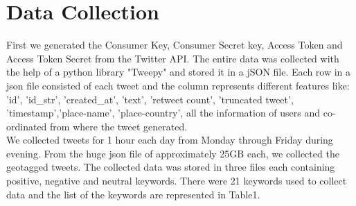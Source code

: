 \documentclass[12pt, oneside]{article}   	%
\begin{document}
\section{Data Collection}

\noindent
First we generated the Consumer Key, Consumer Secret key, Access Token and Access Token Secret from the Twitter API. The entire data was collected with the help of a python library "Tweepy" and stored it in a jSON file. Each row in a json file consisted of each tweet and the column represents different features like: 'id', 'id\_str', 'created\_at', 'text', 'retweet count', 'truncated tweet', 'timestamp','place-name', 'place-country', all the information of users and co-ordinated from where the tweet generated.\\

\noindent
We collected tweets for 1 hour each day from Monday through Friday during evening. From the huge json file of approximately 25GB each, we collected the geotagged tweets. The collected data was stored in three files each containing positive, negative and neutral keywords. There were 21 keywords used to collect data and the list of the keywords are represented in Table1.
\end{document}
